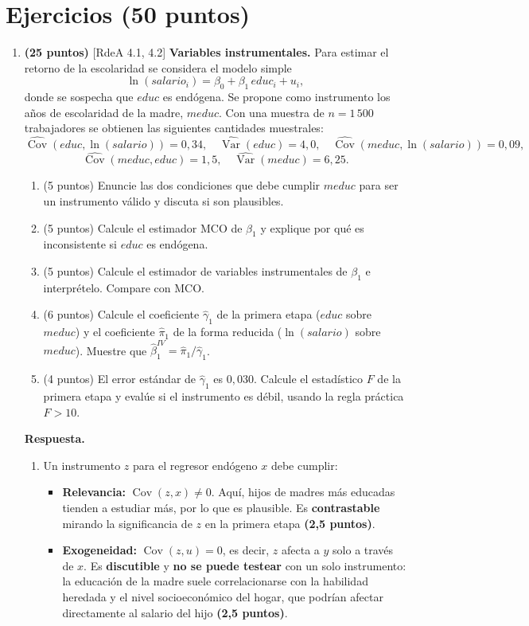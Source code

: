 \documentclass[12pt,letterpaper]{article}
\newcommand{\rdea}[1]{\textsf{\small [RdeA #1]}}
\DeclareMathOperator{\cov}{Cov}
\DeclareMathOperator{\var}{Var}
\newcommand{\sol}{\color{blue}}
\begin{document}
\section{Ejercicios (50 puntos)}
\begin{enumerate}

\item \textbf{(25 puntos)} \rdea{4.1, 4.2} \textbf{Variables instrumentales.} Para estimar el retorno de la escolaridad se considera el modelo simple
\[
\ln(salario_i)=\beta_0+\beta_1\,educ_i+u_i ,
\]
donde se sospecha que $educ$ es endógena. Se propone como instrumento los años de escolaridad de la madre, $meduc$. Con una muestra de $n=1\,500$ trabajadores se obtienen las siguientes cantidades muestrales:
\[
\widehat{\cov}(educ,\ln(salario))=0{,}34,\quad \widehat{\var}(educ)=4{,}0,\quad
\widehat{\cov}(meduc,\ln(salario))=0{,}09,
\]
\[
\widehat{\cov}(meduc,educ)=1{,}5,\quad \widehat{\var}(meduc)=6{,}25.
\]

\begin{enumerate}[label=\alph*)]
    \item (5 puntos) Enuncie las dos condiciones que debe cumplir $meduc$ para ser un instrumento válido y discuta si son plausibles.
    \item (5 puntos) Calcule el estimador MCO de $\beta_1$ y explique por qué es inconsistente si $educ$ es endógena.
    \item (5 puntos) Calcule el estimador de variables instrumentales de $\beta_1$ e interprételo. Compare con MCO.
    \item (6 puntos) Calcule el coeficiente $\hat\gamma_1$ de la primera etapa ($educ$ sobre $meduc$) y el coeficiente $\hat\pi_1$ de la forma reducida ($\ln(salario)$ sobre $meduc$). Muestre que $\hat\beta_1^{IV}=\hat\pi_1/\hat\gamma_1$.
    \item (4 puntos) El error estándar de $\hat\gamma_1$ es $0{,}030$. Calcule el estadístico $F$ de la primera etapa y evalúe si el instrumento es débil, usando la regla práctica $F>10$.
\end{enumerate}

{\sol
\textbf{Respuesta.}
\begin{enumerate}[label=\alph*)]
    \item Un instrumento $z$ para el regresor endógeno $x$ debe cumplir:
    \begin{itemize}
        \item \textbf{Relevancia:} $\cov(z,x)\neq0$. Aquí, hijos de madres más educadas tienden a estudiar más, por lo que es plausible. Es \textbf{contrastable} mirando la significancia de $z$ en la primera etapa \textbf{(2,5 puntos)}.
        \item \textbf{Exogeneidad:} $\cov(z,u)=0$, es decir, $z$ afecta a $y$ solo a través de $x$. Es \textbf{discutible} y \textbf{no se puede testear} con un solo instrumento: la educación de la madre suele correlacionarse con la habilidad heredada y el nivel socioeconómico del hogar, que podrían afectar directamente al salario del hijo \textbf{(2,5 puntos)}.
    \end{itemize}


\end{enumerate}}
\end{enumerate}
\end{document}
